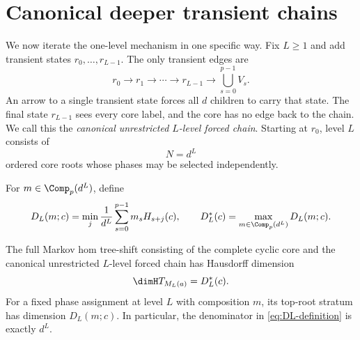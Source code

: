\section{Canonical deeper transient chains}
\label{sec:deep}

We now iterate the one-level mechanism in one specific way.  Fix $L\geq1$
and add transient states $r_0,\ldots,r_{L-1}$.  The only transient edges are
\[
 r_0\longrightarrow r_1\longrightarrow\cdots\longrightarrow r_{L-1}
 \longrightarrow\bigcup_{s=0}^{p-1}V_s.
\]
An arrow to a single transient state forces all $d$ children to carry that
state.  The final state $r_{L-1}$ sees every core label, and the core has no
edge back to the chain.  We call this the \emph{canonical unrestricted
$L$-level forced chain}.  Starting at $r_0$, level $L$ consists of
\[
 N=d^L
\]
ordered core roots whose phases may be selected independently.

For $m\in\Comp_p(d^L)$, define
\begin{equation}
 D_L(m;c)=\min_j\frac1{d^L}\sum_{s=0}^{p-1}m_sH_{s+j}(c),
 \qquad
 D_L^*(c)=\max_{m\in\Comp_p(d^L)}D_L(m;c).
 \label{eq:DL-definition}
\end{equation}

\begin{theorem}
\label{thm:deep-exact}
The full Markov hom tree-shift consisting of the complete cyclic core and the
canonical unrestricted $L$-level forced chain has Hausdorff dimension
\begin{equation}
 \dimH T_{M_L(a)}=D_L^*(c).
 \label{eq:deep-full-dimension}
\end{equation}
For a fixed phase assignment at level $L$ with composition $m$, its top-root
stratum has dimension $D_L(m;c)$.  In particular, the denominator in
\eqref{eq:DL-definition} is exactly $d^L$.
\end{theorem}

